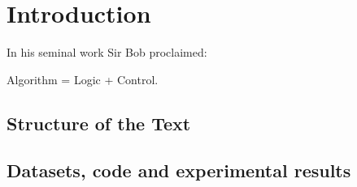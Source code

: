 \chapter{Introduction}\label{ch:introduction}

In his seminal work Sir Bob \textcite{kowalski} proclaimed:
\begin{center}
  Algorithm = Logic + Control.
\end{center}




\section{Structure of the Text}

\section{Datasets, code and experimental results}













\cleardoublepage

